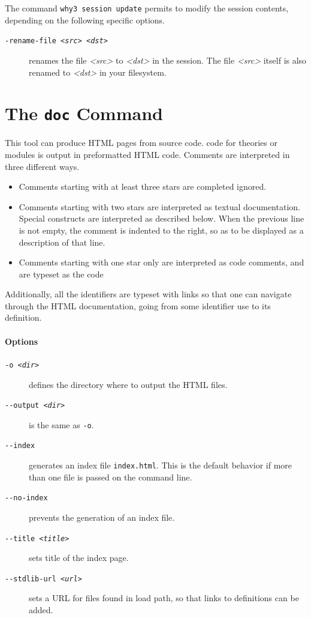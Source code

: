 The command \texttt{why3 session update} permits to modify
the session contents, depending on the following specific options.
\begin{description}
\item[\texttt{-rename-file \textsl{<src>} \textsl{<dst>}}] renames the file \textsl{<src>} to \textsl{<dst>} in the session. The file \textsl{<src>} itself is also renamed to \textsl{<dst>} in your filesystem.
\end{description}


\section{The \texttt{doc} Command}
\label{sec:why3doc}

This tool can produce HTML pages from \why source code.
\why code for theories or modules is output in
preformatted HTML code. Comments are interpreted in three different ways.
\begin{itemize}
\item Comments starting with at least three stars are completed
  ignored.
\item Comments starting with two stars are interpreted as textual
  documentation. Special constructs are interpreted as described
  below. When the previous line is not empty, the comment is indented to
  the right, so as to be displayed as a description of that line.
\item Comments starting with one star only are interpreted as code
  comments, and are typeset as the code
\end{itemize}

Additionally, all the \why identifiers are typeset with links so that
one can navigate through the HTML documentation, going from some
identifier use to its definition.

\paragraph{Options}

\begin{description}
\item[\texttt{-o \textsl{<dir>}}] defines the directory where to
  output the HTML files.
\item[\texttt{-{}-output \textsl{<dir>}}] is the same as \verb|-o|.
\item[\texttt{-{}-index}] generates an index file \texttt{index.html}.
  This is the default behavior if more than one file
  is passed on the command line.
\item[\texttt{-{}-no-index}] prevents the generation of an index file.
\item[\texttt{-{}-title \textsl{<title>}}] sets title of the
  index page.
\item[\texttt{-{}-stdlib-url \textsl{<url>}}] sets a URL for files
  found in load path, so that links to definitions can be added.
\end{description}

